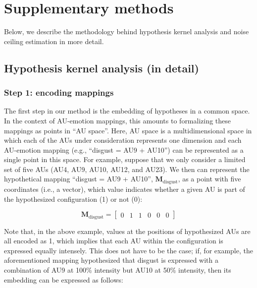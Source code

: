 \documentclass[11pt,american,a4paper,oneside,]{memoir} %
\begin{document}
\hypertarget{hka-supplementary-methods}{%
\section{Supplementary methods}\label{hka-supplementary-methods}}

Below, we describe the methodology behind hypothesis kernel analysis and noise ceiling estimation in more detail.

\hypertarget{hypothesis-kernel-analysis-in-detail}{%
\subsection{Hypothesis kernel analysis (in detail)}\label{hypothesis-kernel-analysis-in-detail}}

\hypertarget{step-1-encoding-mappings}{%
\subsubsection{Step 1: encoding mappings}\label{step-1-encoding-mappings}}

The first step in our method is the embedding of hypotheses in a common space. In the context of AU-emotion mappings, this amounts to formalizing these mappings as points in ``AU space''. Here, AU space is a multidimensional space in which each of the AUs under consideration represents one dimension and each AU-emotion mapping (e.g., ``disgust = AU9 + AU10'') can be represented as a single point in this space. For example, suppose that we only consider a limited set of five AUs (AU4, AU9, AU10, AU12, and AU23). We then can represent the hypothetical mapping ``disgust = AU9 + AU10'', \(\mathbf{M}_{\mathrm{disgust}}\), as a point with five coordinates (i.e., a vector), which value indicates whether a given AU is part of the hypothesized configuration (1) or not (0):

\begin{equation}
\mathbf{M}_{\mathrm{disgust}} = \begin{bmatrix} 0 & 1 & 1 & 0 & 0 & 0 \end{bmatrix}
\end{equation}

Note that, in the above example, values at the positions of hypothesized AUs are all encoded as 1, which implies that each AU within the configuration is expressed equally intensely. This does not have to be the case; if, for example, the aforementioned mapping hypothesized that disgust is expressed with a combination of AU9 at 100\% intensity but AU10 at 50\% intensity, then its embedding can be expressed as follows:
\end{document}
